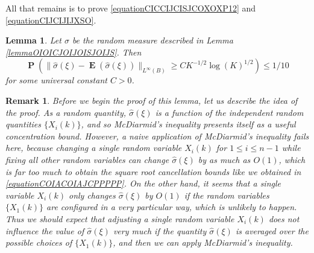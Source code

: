 \documentclass[12pt,reqno]{article}
\numberwithin{equation}{section}
\newtheorem{lemma}[theorem]{Lemma}
\newtheorem{remark}[theorem]{Remark}
\numberwithin{theorem}{section}
\DeclareMathOperator{\EE}{\mathbf{E}}
\DeclareMathOperator{\PP}{\mathbf{P}}
\begin{document}
All that remains is to prove \eqref{equationCICCIJCISJCOXOXP12} and \eqref{equationCIJCIJIJXSO}.

\begin{lemma} \label{lemma24901401921209}
    Let $\sigma$ be the random measure described in Lemma \ref{lemmaOIOICJOIJOISJOIJS}. Then
    \[ \PP \left( \| \widehat{\sigma}(\xi) - \EE(\widehat{\sigma}(\xi)) \|_{L^\infty(B)} \geq C K^{-1/2} \log(K)^{1/2} \right) \leq 1/10 \]
    for some universal constant $C > 0$.
\end{lemma}

\begin{remark}
    Before we begin the proof of this lemma, let us describe the idea of the proof. As a random quantity, $\widehat{\sigma}(\xi)$ is a function of the independent random quantities $\{ X_i(k) \}$, and so McDiarmid's inequality presents itself as a useful concentration bound. However, a naive application of McDiarmid's inequality fails here, because changing a single random variable $X_i(k)$ for $1 \leq i \leq n-1$ while fixing all other random variables can change $\widehat{\sigma}(\xi)$ by as much as $O(1)$, which is far too much to obtain the square root cancellation bounds like we obtained in \eqref{equationCOIACOIAJCPPPPP}. On the other hand, it seems that a single variable $X_i(k)$ only changes $\widehat{\sigma}(\xi)$ by $O(1)$ if the random variables $\{ X_1(k) \}$ are configured in a very particular way, which is unlikely to happen. Thus we should expect that adjusting a single random variable $X_i(k)$ does not influence the value of $\widehat{\sigma}(\xi)$ very much if the quantity $\widehat{\sigma}(\xi)$ is \emph{averaged} over the possible choices of $\{ X_1(k) \}$, and then we can apply McDiarmid's inequality.
\end{remark}
\end{document}
